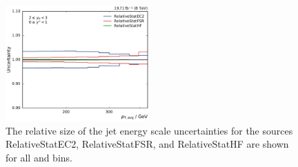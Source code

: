 \begin{figure}[htbp]
    \includegraphics[width=0.49\textwidth]{figures/measurement/jec_relunc_4_yb2ys0.pdf}
    \caption[Split-up of JEC uncertainty sources: Part V]{The relative size of the jet energy scale
             uncertainties for the sources RelativeStatEC2, RelativeStatFSR, and
             RelativeStatHF are shown for all \ystar and \yboost bins.}
    \label{fig:jec_relunc_4}
\end{figure}


